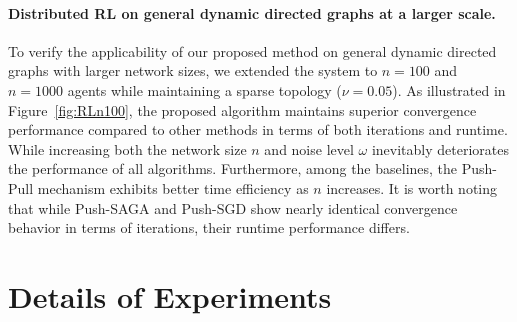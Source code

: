 \documentclass{article}
\theoremstyle{plain}
\theoremstyle{definition}
\theoremstyle{remark}
\begin{document}
\paragraph{Distributed RL on general dynamic directed graphs at a larger scale.} 
To verify the applicability of our proposed method on general dynamic directed graphs with larger network sizes, we extended the system to $n=100$ and $n=1000$ agents while maintaining a sparse topology ($\nu=0.05$). As illustrated in Figure~\ref{fig:RLn100}, the proposed algorithm maintains superior convergence performance compared to other methods in terms of both iterations and runtime. 
While increasing both the network size $n$ and noise level $\omega$ inevitably deteriorates the performance of all algorithms. 
Furthermore, among the baselines, the Push-Pull mechanism exhibits better time efficiency as $n$ increases. 
It is worth noting that while Push-SAGA and Push-SGD show nearly identical convergence behavior in terms of iterations, their runtime performance differs.


\section{Details of Experiments} 
\end{document}

